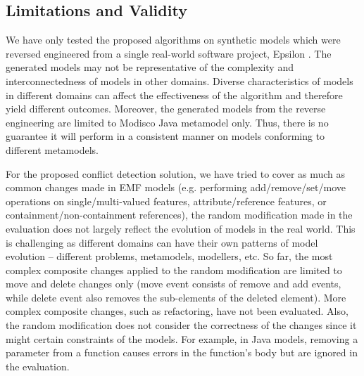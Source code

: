 \subsection{Limitations and Validity}
\label{sec:limitation_and_Threat_to_validity}
We have only tested the proposed algorithms on synthetic models which were reversed engineered from a single real-world software project, Epsilon \cite{eclipse2018epsilongit}. The generated models may not be representative of the complexity and interconnectedness of models in other domains. Diverse characteristics of models in different domains can affect the effectiveness of the algorithm and therefore yield different outcomes. Moreover, the generated models from the reverse engineering are limited to Modisco Java \cite{eclipse2018modiscojava} metamodel only. Thus, there is no guarantee it will perform in a consistent manner on models conforming to different metamodels.

For the proposed conflict detection solution, we have tried to cover as much as common changes made in EMF models (e.g. performing \textsf{add}/\textsf{remove}/\textsf{set}/\textsf{move} operations on \textsf{single}/\textsf{multi}-\textsf{valued} features, \textsf{attribute}/\textsf{reference} features, or \textsf{containment}/\textsf{non}-\textsf{containment} references), the random modification made in the evaluation does not largely reflect the evolution of models in the real world. This is challenging as different domains can have their own patterns of model evolution -- different problems, metamodels, modellers, etc. So far, the most complex composite changes applied to the random modification are limited to \textsf{move} and \textsf{delete} changes only (\textsf{move} event consists of \textsf{remove} and \textsf{add} events, while \textsf{delete} event also removes the sub-elements of the deleted element). More complex composite changes, such as refactoring, have not been evaluated. Also, the random modification does not consider the correctness of the changes since it might certain constraints of the models. For example, in Java \cite{eclipse2018modiscojava} models, removing a parameter from a function causes errors in the function's body but are ignored in the evaluation. 

